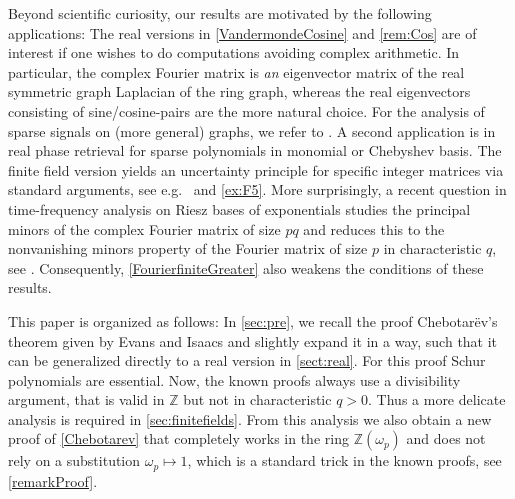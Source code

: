 \documentclass[a4paper]{article}
\renewcommand{\o}{\omega}
\newcommand{\Z}{\ensuremath{\mathbb{Z}}}
\numberwithin{equation}{section}
\numberwithin{table}{section}
\numberwithin{figure}{section}
\begin{document}

Beyond scientific curiosity, our results are motivated by the following applications: The real versions in \cref{VandermondeCosine} and \cref{rem:Cos} are of interest if one wishes to do computations avoiding complex arithmetic. In particular, the complex Fourier matrix is \emph{an} eigenvector matrix of the real symmetric graph Laplacian of the ring graph, whereas the real eigenvectors consisting of sine/cosine-pairs are the more natural choice. For the analysis of sparse signals  on (more general) graphs, we refer to \cite{Em24,EmJuKu25}. A second application is in real phase retrieval for sparse polynomials in monomial or Chebyshev basis.
The finite field version yields an uncertainty principle for specific  integer matrices via standard arguments, see e.g.~\cite[Proof of Thm.~1.1]{Tao} and \cref{ex:F5}. More surprisingly, a recent question in time-frequency analysis on Riesz bases of exponentials studies the principal minors of the complex Fourier matrix of size $pq$ and reduces this to the nonvanishing minors property of the Fourier matrix of size $p$ in characteristic $q$, see \cite{carageaarticle,loukaki}. Consequently, \cref{FourierfiniteGreater} also weakens the conditions of these results.

This paper is organized as follows: In \cref{sec:pre}, we recall the proof Chebotar\"ev's theorem given by Evans and Isaacs \cite{Evans} and slightly expand it in a way, such that it can be generalized directly to a real version in \cref{sect:real}. For this proof Schur polynomials are essential.
Now, the known proofs always use a divisibility argument, that is valid in $\Z$ but not in characteristic $q>0$. Thus a more delicate analysis is required in \cref{sec:finitefields}. From this analysis we also obtain a new proof of \cref{Chebotarev} that completely works in the ring $\Z(\o_p)$ and does not rely on a substitution $\o_p \mapsto 1$, which is a standard trick in the known proofs, see \cref{remarkProof}.
\end{document}
